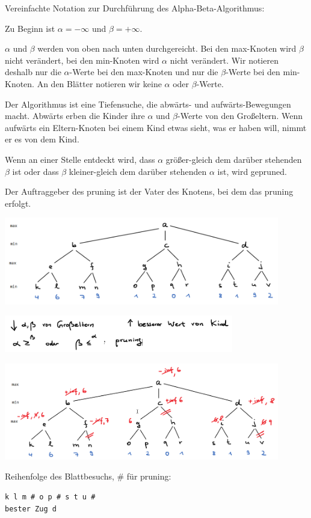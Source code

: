 \documentclass{beamer}
\begin{document}
\begin{frame}[fragile]
Vereinfachte Notation zur Durchführung des Alpha-Beta-Algorithmus:

Zu Beginn ist $\alpha = -\infty$ und $\beta = +\infty$.

$\alpha$ und $\beta$ werden von oben nach unten durchgereicht. Bei den max-Knoten wird $\beta$ nicht verändert, bei den min-Knoten wird $\alpha$ nicht verändert. Wir notieren deshalb nur die $\alpha$-Werte bei den max-Knoten und nur die $\beta$-Werte bei den min-Knoten. An den Blätter notieren wir keine $\alpha$ oder $\beta$-Werte.

Der Algorithmus ist eine Tiefensuche, die abwärts- und aufwärts-Bewegungen macht. Abwärts erben die Kinder ihre  $\alpha$ und $\beta$-Werte von den Großeltern. Wenn aufwärts ein Eltern-Knoten bei einem Kind etwas sieht, was er haben will, nimmt er es von dem Kind.

Wenn an einer Stelle entdeckt wird, dass $\alpha$ größer-gleich dem darüber stehenden $\beta$ ist oder
dass $\beta$ kleiner-gleich dem darüber stehenden  $\alpha$ ist, wird gepruned.

Der Auftraggeber des pruning ist der Vater des Knotens, bei dem das pruning erfolgt.
\end{frame}

\begin{frame}[fragile]
\includegraphics[width=12cm]{bild14.png} 

\includegraphics[width=10cm]{kurzform.png} 



\end{frame}

\begin{frame}[fragile]
\includegraphics[width=12cm]{bild15a.png} 

Reihenfolge des Blattbesuchs,  \# für pruning:
\begin{lstlisting}
k l m # o p # s t u # 
bester Zug d
\end{lstlisting} 
\end{frame}



 
\end{document}
